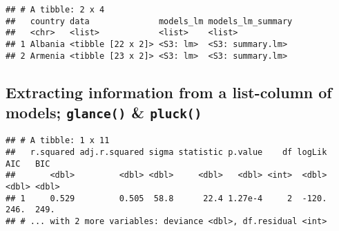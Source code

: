 \documentclass[]{article}
\newenvironment{Shaded}{\begin{snugshade}}{\end{snugshade}}
\newcommand{\KeywordTok}[1]{\textcolor[rgb]{0.13,0.29,0.53}{\textbf{#1}}}
\newcommand{\DataTypeTok}[1]{\textcolor[rgb]{0.13,0.29,0.53}{#1}}
\newcommand{\DecValTok}[1]{\textcolor[rgb]{0.00,0.00,0.81}{#1}}
\newcommand{\StringTok}[1]{\textcolor[rgb]{0.31,0.60,0.02}{#1}}
\newcommand{\OperatorTok}[1]{\textcolor[rgb]{0.81,0.36,0.00}{\textbf{#1}}}
\newcommand{\NormalTok}[1]{#1}
\begin{document}
\begin{verbatim}
## # A tibble: 2 x 4
##   country data              models_lm models_lm_summary
##   <chr>   <list>            <list>    <list>           
## 1 Albania <tibble [22 x 2]> <S3: lm>  <S3: summary.lm> 
## 2 Armenia <tibble [23 x 2]> <S3: lm>  <S3: summary.lm>
\end{verbatim}

\subsection{\texorpdfstring{Extracting information from a list-column of
models; \texttt{glance()} \&
\texttt{pluck()}}{Extracting information from a list-column of models; glance() \& pluck()}}\label{extracting-information-from-a-list-column-of-models-glance-pluck}

\begin{Shaded}
\end{Shaded}

\begin{verbatim}
## # A tibble: 1 x 11
##   r.squared adj.r.squared sigma statistic p.value    df logLik   AIC   BIC
##       <dbl>         <dbl> <dbl>     <dbl>   <dbl> <int>  <dbl> <dbl> <dbl>
## 1     0.529         0.505  58.8      22.4 1.27e-4     2  -120.  246.  249.
## # ... with 2 more variables: deviance <dbl>, df.residual <int>
\end{verbatim}

\begin{Shaded}
\end{Shaded}
\end{document}
